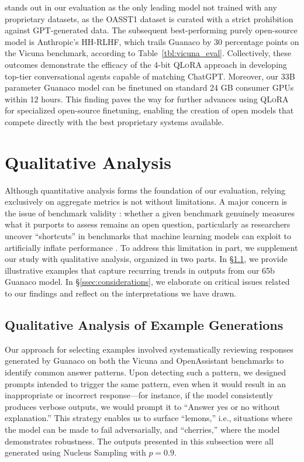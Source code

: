  stands out in our evaluation as the only leading model not trained with any proprietary datasets, as the OASST1 dataset is curated with a strict prohibition against GPT-generated data. The subsequent best-performing purely open-source model is Anthropic’s HH-RLHF, which trails {Guanaco} by 30 percentage points on the Vicuna benchmark, according to Table~\ref{tbl:vicuna_eval}. Collectively, these outcomes demonstrate the efficacy of the 4-bit \textsc{QLoRA} approach in developing top-tier conversational agents capable of matching ChatGPT. Moreover, our 33B parameter {Guanaco} model can be finetuned on standard 24 GB consumer GPUs within 12 hours. This finding paves the way for further advances using \textsc{QLoRA} for specialized open-source finetuning, enabling the creation of open models that compete directly with the best proprietary systems available.

\section{Qualitative Analysis}

Although quantitative analysis forms the foundation of our evaluation, relying exclusively on aggregate metrics is not without limitations. A major concern is the issue of benchmark validity \citep{liao2021we}: whether a given benchmark genuinely measures what it purports to assess remains an open question, particularly as researchers uncover ``shortcuts'' in benchmarks that machine learning models can exploit to artificially inflate performance \citep{gururangan2018annotation, poliak2018hypothesis}. To address this limitation in part, we supplement our study with qualitative analysis, organized in two parts. In \S\ref{ssec:examples}, we provide illustrative examples that capture recurring trends in outputs from our 65b {Guanaco} model. In \S\ref{ssec:considerations}, we elaborate on critical issues related to our findings and reflect on the interpretations we have drawn.

\subsection{Qualitative Analysis of Example Generations}
\label{ssec:examples}

Our approach for selecting examples involved systematically reviewing responses generated by {Guanaco} on both the Vicuna and OpenAssistant benchmarks to identify common answer patterns. Upon detecting such a pattern, we designed prompts intended to trigger the same pattern, even when it would result in an inappropriate or incorrect response—for instance, if the model consistently produces verbose outputs, we would prompt it to ``Answer yes or no without explanation.'' This strategy enables us to surface ``lemons,'' i.e., situations where the model can be made to fail adversarially, and ``cherries,'' where the model demonstrates robustness. The outputs presented in this subsection were all generated using Nucleus Sampling \cite{holtzmancurious} with $p=0.9$.

